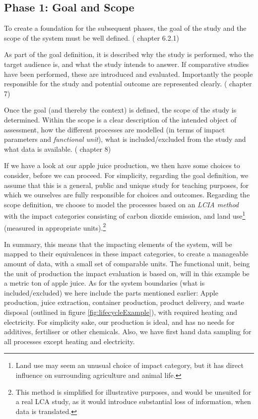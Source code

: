 \subsection{Phase 1: Goal and Scope} \label{ssec:Phase1}
To create a foundation for the subsequent phases, the goal of the study and the scope of the system must be well defined. (\cite{LCA_TheoryAndPractice} chapter 6.2.1) 

As part of the goal definition, it is described why the study is performed, who the target audience is, and what the study intends to answer. If comparative studies have been performed, these are introduced and evaluated. Importantly the people responsible for the study and potential outcome are represented clearly. (\cite{LCA_TheoryAndPractice} chapter 7) 

Once the goal (and thereby the context) is defined, the scope of the study is determined. Within the scope is a clear description of the intended object of assessment, how the different processes are modelled (in terms of impact parameters and \emph{functional unit}), what is included/excluded from the study and what data is available. (\cite{LCA_TheoryAndPractice} chapter 8)

If we have a look at our apple juice production, we then have some choices to consider, before we can proceed. For simplicity, regarding the goal definition, we assume that this is a general, public and unique study for teaching purposes, for which we ourselves are fully responsible for choices and outcomes. Regarding the scope definition, we choose to model the processes based on an \emph{LCIA method} with the impact categories consisting of carbon dioxide emission, and land use\footnote{Land use may seem an unusual choice of impact category, but it has direct influence on surrounding agriculture and animal life.} (measured in appropriate units).\footnote{This method is simplified for illustrative purposes, and would be unsuited for a real LCA study, as it would introduce substantial loss of information, when data is translated.}

In summary, this means that the impacting elements of the system, will be mapped to their equivalences in these impact categories, to create a manageable amount of data, with a small set of comparable units. The functional unit, being the unit of production the impact evaluation is based on, will in this example be a metric ton of apple juice. As for the system boundaries (what is included/excluded) we here include the parts mentioned earlier: Apple production, juice extraction, container production, product delivery, and waste disposal (outlined in figure \ref{fig:lifecycleExample}), with required heating and electricity. For simplicity sake, our production is ideal, and has no needs for additives, fertiliser or other chemicals. Also, we have first hand data sampling for all processes except heating and electricity. 

